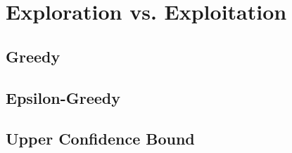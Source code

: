 \documentclass[../xlapes02]{subfiles}
\begin{document}
    \section{Exploration vs. Exploitation}\label{sec:exploration-vs-exploitation}

    \subsection{Greedy}\label{subsec:greedy}

    \subsection{Epsilon-Greedy}\label{subsec:epsilon-greedy}

    \subsection{Upper Confidence Bound}\label{subsec:upper-confidence-bound}


\end{document}
